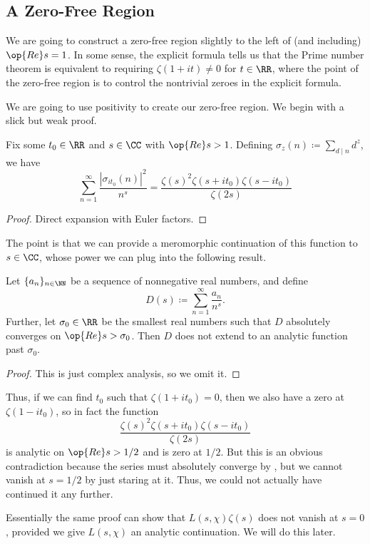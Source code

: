\documentclass[../notes.tex]{subfiles}
\begin{document}
\subsection{A Zero-Free Region}
We are going to construct a zero-free region slightly to the left of (and including) $\op{Re}s=1$. In some sense, the explicit formula tells us that the Prime number theorem is equivalent to requiring $\zeta(1+it)\ne0$ for $t\in\RR$, where the point of the zero-free region is to control the nontrivial zeroes in the explicit formula.

We are going to use positivity to create our zero-free region. We begin with a slick but weak proof.
\begin{proposition}
	Fix some $t_0\in\RR$ and $s\in\CC$ with $\op{Re}s>1$. Defining $\sigma_z(n)\coloneqq\sum_{d\mid n}d^z$, we have
	\[\sum_{n=1}^\infty\frac{\left|\sigma_{it_0}(n)\right|^2}{n^s}=\frac{\zeta(s)^2\zeta(s+it_0)\zeta(s-it_0)}{\zeta(2s)}\]
\end{proposition}
\begin{proof}
	Direct expansion with Euler factors.
\end{proof}
The point is that we can provide a meromorphic continuation of this function to $s\in\CC$, whose power we can plug into the following result.
\begin{lemma}[Landau] \label{lem:landau}
	Let $\{a_n\}_{n\in\NN}$ be a sequence of nonnegative real numbers, and define
	\[D(s)\coloneqq\sum_{n=1}^\infty\frac{a_n}{n^s}.\]
	Further, let $\sigma_0\in\RR$ be the smallest real numbers such that $D$ absolutely converges on $\op{Re}s>\sigma_0$. Then $D$ does not extend to an analytic function past $\sigma_0$.
\end{lemma}
\begin{proof}
	This is just complex analysis, so we omit it.
\end{proof}
Thus, if we can find $t_0$ such that $\zeta(1+it_0)=0$, then we also have a zero at $\zeta(1-it_0)$, so in fact the function
\[\frac{\zeta(s)^2\zeta(s+it_0)\zeta(s-it_0)}{\zeta(2s)}\]
is analytic on $\op{Re}s>1/2$ and is zero at $1/2$. But this is an obvious contradiction because the series must absolutely converge by , but we cannot vanish at $s=1/2$ by just staring at it. Thus, we could not actually have continued it any further.\todo{}
\begin{remark}
	Essentially the same proof can show that $L(s,\chi)\zeta(s)$ does not vanish at $s=0$, provided we give $L(s,\chi)$ an analytic continuation. We will do this later.
\end{remark}
\end{document}
